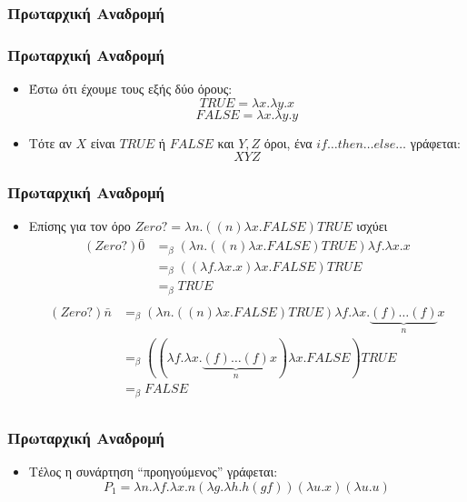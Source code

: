 \documentclass{beamer}
\begin{document}
\subsubsection{Πρωταρχική Αναδρομή}

\begin{frame}
  \frametitle{Πρωταρχική Αναδρομή}
  \begin{itemize}
  \item Έστω ότι έχουμε τους εξής δύο όρους:
    $$ TRUE = \lambda x. \lambda y. x $$
    $$ FALSE = \lambda x. \lambda y. y $$
    \pause
  \item Τότε αν $X$ είναι $TRUE$ ή $FALSE$ και $Y,Z$ όροι, ένα
    $if\ldots then \ldots else \ldots$ γράφεται:
    $$ XYZ $$
  \end{itemize}
\end{frame}

\begin{frame}
  \frametitle{Πρωταρχική Αναδρομή}
  \begin{itemize}
  \item Επίσης για τον όρο $Zero? = \lambda n. ((n) \lambda x . FALSE)
    TRUE$ ισχύει \pause
    $$
    \begin{array}{ll}
      (Zero?) \bar{0} & =_\beta (\lambda n. ((n) \lambda x . FALSE)
      TRUE) \lambda f. \lambda x. x \\
      & =_\beta ((\lambda f. \lambda x. x) \lambda x . FALSE) TRUE \\
      & =_\beta TRUE \\
    \end{array}
    $$                
    \pause
    $$
    \begin{array}{ll}
      (Zero?) \bar{n} & =_\beta (\lambda n. ((n) \lambda x . FALSE)
      TRUE) \lambda f . \lambda x . \underbrace{(f) \ldots (f)}_n x \\
      & =_\beta ((\lambda f . \lambda x . \underbrace{(f) \ldots (f)}_n
      x) \lambda x . FALSE) TRUE \\ & =_\beta FALSE \\
    \end{array}
    $$                
  \end{itemize}
\end{frame}

\begin{frame}
  \frametitle{Πρωταρχική Αναδρομή}
  \begin{itemize}
  \item Τέλος η συνάρτηση ``προηγούμενος'' γράφεται:
    $$ P_1 = \lambda n. \lambda f. \lambda x. n (\lambda g. \lambda
    h. h (g f)) (\lambda u.x) (\lambda u. u) $$
  \end{itemize}
\end{frame}
\end{document}
